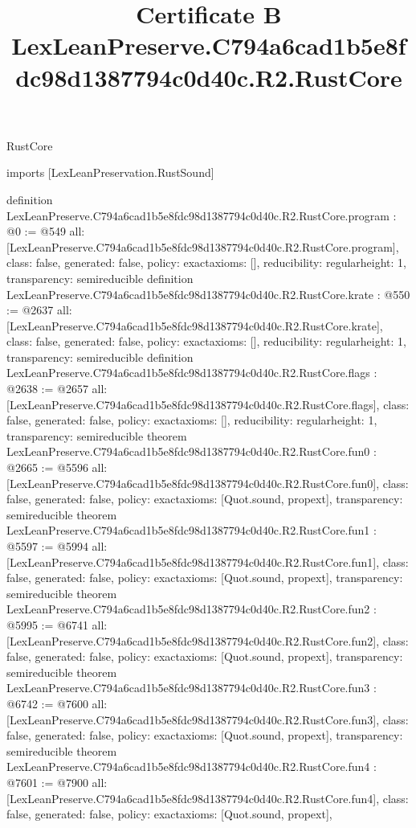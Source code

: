 \begin{lexlean}{RustCore}
\title{Certificate B LexLeanPreserve.C794a6cad1b5e8fdc98d1387794c0d40c.R2.RustCore}
\begin{coremodule}
imports [LexLeanPreservation.RustSound]

definition LexLeanPreserve.C794a6cad1b5e8fdc98d1387794c0d40c.R2.RustCore.program : @0 := @549 {
  all: [LexLeanPreserve.C794a6cad1b5e8fdc98d1387794c0d40c.R2.RustCore.program],
  class: false,
  generated: false,
  policy: exact{axioms: []},
  reducibility: regular{height: 1},
  transparency: semireducible
}
definition LexLeanPreserve.C794a6cad1b5e8fdc98d1387794c0d40c.R2.RustCore.krate : @550 := @2637 {
  all: [LexLeanPreserve.C794a6cad1b5e8fdc98d1387794c0d40c.R2.RustCore.krate],
  class: false,
  generated: false,
  policy: exact{axioms: []},
  reducibility: regular{height: 1},
  transparency: semireducible
}
definition LexLeanPreserve.C794a6cad1b5e8fdc98d1387794c0d40c.R2.RustCore.flags : @2638 := @2657 {
  all: [LexLeanPreserve.C794a6cad1b5e8fdc98d1387794c0d40c.R2.RustCore.flags],
  class: false,
  generated: false,
  policy: exact{axioms: []},
  reducibility: regular{height: 1},
  transparency: semireducible
}
theorem LexLeanPreserve.C794a6cad1b5e8fdc98d1387794c0d40c.R2.RustCore.fun0 : @2665 := @5596 {
  all: [LexLeanPreserve.C794a6cad1b5e8fdc98d1387794c0d40c.R2.RustCore.fun0],
  class: false,
  generated: false,
  policy: exact{axioms: [Quot.sound, propext]},
  transparency: semireducible
}
theorem LexLeanPreserve.C794a6cad1b5e8fdc98d1387794c0d40c.R2.RustCore.fun1 : @5597 := @5994 {
  all: [LexLeanPreserve.C794a6cad1b5e8fdc98d1387794c0d40c.R2.RustCore.fun1],
  class: false,
  generated: false,
  policy: exact{axioms: [Quot.sound, propext]},
  transparency: semireducible
}
theorem LexLeanPreserve.C794a6cad1b5e8fdc98d1387794c0d40c.R2.RustCore.fun2 : @5995 := @6741 {
  all: [LexLeanPreserve.C794a6cad1b5e8fdc98d1387794c0d40c.R2.RustCore.fun2],
  class: false,
  generated: false,
  policy: exact{axioms: [Quot.sound, propext]},
  transparency: semireducible
}
theorem LexLeanPreserve.C794a6cad1b5e8fdc98d1387794c0d40c.R2.RustCore.fun3 : @6742 := @7600 {
  all: [LexLeanPreserve.C794a6cad1b5e8fdc98d1387794c0d40c.R2.RustCore.fun3],
  class: false,
  generated: false,
  policy: exact{axioms: [Quot.sound, propext]},
  transparency: semireducible
}
theorem LexLeanPreserve.C794a6cad1b5e8fdc98d1387794c0d40c.R2.RustCore.fun4 : @7601 := @7900 {
  all: [LexLeanPreserve.C794a6cad1b5e8fdc98d1387794c0d40c.R2.RustCore.fun4],
  class: false,
  generated: false,
  policy: exact{axioms: [Quot.sound, propext]},
}
\end{coremodule}
\end{lexlean}
